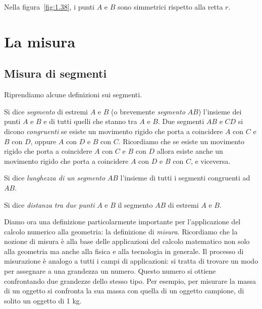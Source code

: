 Nella figura~\ref{fig:1.38}, i punti $A$ e $B$ sono simmetrici 
rispetto alla retta $r$.

\vspazio\ovalbox{\risolvii \ref{ese:1.66}, \ref{ese:1.67}, 
\ref{ese:1.68}, \ref{ese:1.69}, \ref{ese:1.70}, \ref{ese:1.71}, 
\ref{ese:1.72}, \ref{ese:1.73}, \ref{ese:1.74}, \ref{ese:1.75}, 
\ref{ese:1.76}, \ref{ese:1.77}, \ref{ese:1.78},}

\ovalbox{\ref{ese:1.79}, \ref{ese:1.80}, \ref{ese:1.81}, 
\ref{ese:1.82}, \ref{ese:1.83}, \ref{ese:1.84}, \ref{ese:1.85}, 
\ref{ese:1.86}, \ref{ese:1.87}, \ref{ese:1.88}, \ref{ese:1.89}, 
\ref{ese:1.90}, \ref{ese:1.91}, \ref{ese:1.92},\ref{ese:1.93}, 
\ref{ese:1.94}, \ref{ese:1.95},}

\ovalbox{\ref{ese:1.96}, \ref{ese:1.97}, \ref{ese:1.98}, 
\ref{ese:1.99}, \ref{ese:1.100}, \ref{ese:1.101}, \ref{ese:1.102}, 
\ref{ese:1.103}}


\section{La misura}\label{sect:misura}

\subsection{Misura di segmenti}

Riprendiamo alcune definizioni sui segmenti.

Si dice \emph{segmento} di estremi $A$ e $B$ (o brevemente 
\emph{segmento} $AB$) l'insieme dei punti $A$ e $B$ e di tutti quelli 
che stanno tra $A$ e $B$.
Due segmenti $AB$ e $CD$ si dicono \emph{congruenti} se esiste un 
movimento rigido che porta a coincidere $A$ con $C$ e $B$ con $D$, 
oppure $A$ con $D$ e $B$ con $C$. Ricordiamo che se esiste un 
movimento rigido che porta a coincidere $A$ con $C$ e $B$ con $D$ 
allora esiste anche un movimento rigido che porta a coincidere $A$ 
con $D$ e $B$ con $C$, e viceversa.

Si dice \emph{lunghezza di un segmento} $AB$ l'insieme di tutti i 
segmenti congruenti ad $AB$.

Si dice \emph{distanza tra due punti} $A$ e $B$ il segmento $AB$ di 
estremi $A$ e $B$.

Diamo ora una definizione particolarmente importante per 
l'applicazione del calcolo numerico alla geometria: la definizione di 
\emph{misura}. Ricordiamo che la nozione di misura è alla base delle 
applicazioni del calcolo matematico non solo alla geometria ma anche 
alla fisica e alla tecnologia in generale. Il processo di misurazione 
è analogo a tutti i campi di applicazioni: si tratta di trovare un 
modo per assegnare a una grandezza un numero. Questo numero si 
ottiene confrontando due grandezze dello stesso tipo. Per esempio, 
per misurare la massa di un oggetto si confronta la sua massa con 
quella di un oggetto campione, di solito un oggetto di 1 kg.

